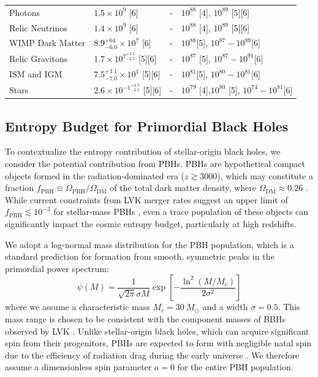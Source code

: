 \documentclass[twocolumn]{aastex631}
\begin{document}
\begin{table}[t!]
{\begin{tabular}{llll}
\hline
Photons & $1.5 \times 10^{9}$ [6] & - & $10^{88}$ [4], $10^{89}$ [5][6]\\
Relic Neutrinos & $1.4 \times 10^{9}$ [6] & - & $10^{88}$ [4], $10^{89}$ [5][6]\\
WIMP Dark Matter & $8.9^{+64}_{-6.0} \times 10^{7}$ [6] & - & $10^{88}$[5], $10^{87}{-}10^{89}$[6]\\
Relic Gravitons & $1.7 \times 10^{{7}^{+3.5}_{-2.5}}$ [5][6] & - & $10^{87}$ [5], $10^{87}{-}10^{91}$[6]\\
ISM and IGM & $7.5^{+1.1}_{-7.0} \times 10^1$ [5][6] & - & $10^{81}$[5], $10^{80}{-}10^{81}$[6]\\
Stars & $2.6\times10^{{-1}^{+4.5}_{-3.7}}$ [5][6] & - & $10^{79}$ [4],$10^{80}$ [5], $10^{74}{-}10^{81}$[6]\\
\hline\hline
\end{tabular}%
}
\end{table}




\subsection{Entropy Budget for Primordial Black Holes}
To contextualize the entropy contribution of stellar-origin black holes, we consider the potential contribution from PBHs. PBHs are hypothetical compact objects formed in the radiation-dominated era ($z \gtrsim 3000$), which may constitute a fraction $f_\mathrm{PBH} \equiv \Omega_\mathrm{PBH} / \Omega_\mathrm{DM}$ of the total dark matter density, where $\Omega_\mathrm{DM} \approx 0.26$ \citep{2020A&A...641A...6P}. While current constraints from LVK merger rates suggest an upper limit of $f_\mathrm{PBH} \lesssim 10^{-3}$ for stellar-mass PBHs \citep{Sasaki_2016, H_tsi_2021}, even a trace population of these objects can significantly impact the cosmic entropy budget, particularly at high redshifts.

We adopt a log-normal mass distribution for the PBH population, which is a standard prediction for formation from smooth, symmetric peaks in the primordial power spectrum:
\begin{equation}
    \psi(M) = \frac{1}{\sqrt{2\pi}\sigma M} \exp\left[ -\frac{\ln^2(M/M_c)}{2\sigma^2} \right]
\end{equation}
where we assume a characteristic mass $M_c = 30~M_\odot$ and a width $\sigma = 0.5$. This mass range is chosen to be consistent with the component masses of BBHs observed by LVK \citep{KAGRA:2021duu, gwtc-3-pop, gwtc4pop}. Unlike stellar-origin black holes, which can acquire significant spin from their progenitors, PBHs are expected to form with negligible natal spin due to the efficiency of radiation drag during the early universe \citep{Raidal_2019}. We therefore assume a dimensionless spin parameter $a = 0$ for the entire PBH population.
\end{document}
